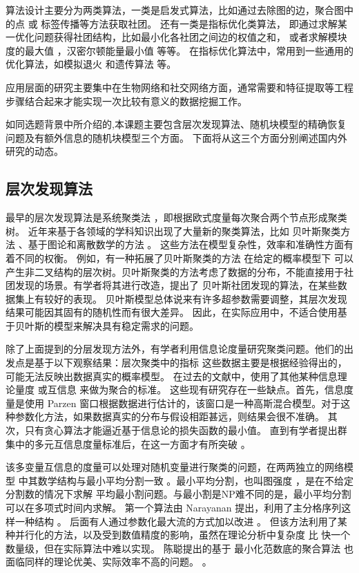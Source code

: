 算法设计主要分为两类算法，一类是启发式算法，比如通过去除图的边\cite{girvan2002community}，聚合图中的点 \cite{clauset2004finding}或
标签传播\cite{raghavan2007near}等方法获取社团。
还有一类是指标优化类算法，
即通过求解某一优化问题获得社团结构，比如最小化各社团之间边的权值之和，
或者求解模块度的最大值 \cite{newman2006modularity}，汉密尔顿能量最小值
\cite{PhysRevLett.93.218701} 等等。
在指标优化算法中，常用到一些通用的优化算法，如模拟退火\cite{PhysRevE.71.046101}
和遗传算法 \cite{pizzuti2008ga}等。

应用层面的研究主要集中在生物网络和社交网络方面，通常需要和特征提取等工程步骤结合起来才能实现一次比较有意义的数据挖掘工作。

如同选题背景中所介绍的,本课题主要包含层次发现算法、随机块模型的精确恢复问题及有额外信息的随机块模型三个方面。
下面将从这三个方面分别阐述国内外研究的动态。
\subsection{层次发现算法}

最早的层次发现算法是系统聚类法 \cite{slink}，即根据欧式度量每次聚合两个节点形成聚类树。
近年来基于各领域的学科知识出现了大量新的聚类算法，比如
贝叶斯聚类方法 \cite{bhc}、基于图论和离散数学的方法 \cite{dasgupta2016cost}
。
这些方法在模型复杂性，效率和准确性方面有着不同的权衡。
例如，有一种拓展了贝叶斯聚类的方法 \cite{blundell2011discovering}
在给定的概率模型下
可以产生非二叉结构的层次树。贝叶斯聚类的方法考虑了数据的分布，不能直接用于社团发现的场景。有学者将其进行改造，提出了
贝叶斯社团发现的算法\cite{RN23}，在某些数据集上有较好的表现。
贝叶斯模型总体说来有许多超参数需要调整，其层次发现结果可能因其固有的随机性而有很大差异。 因此，在实际应用中，不适合使用基于贝叶斯的模型来解决具有稳定需求的问题。 

除了上面提到的分层发现方法外，有学者利用信息论度量研究聚类问题。他们的出发点是基于以下观察结果：层次聚类中的指标
这些数据主要是根据经验得出的，可能无法反映出数据真实的概率模型。
在过去的文献中，使用了其他某种信息理论量度 \cite{ic2002} 或互信息\cite{mim}
来做为聚合的标准。
这些现有研究存在一些缺点。首先，信息度量是使用 Parzen 窗口根据数据进行估计的，该窗口是一种高斯混合模型。对于这种参数化方法，如果数据真实的分布与假设相距甚远，则结果会很不准确。
其次，只有贪心算法才能逼近基于信息论的损失函数的最小值。 
直到有学者提出群集中的多元互信息度量标准后，在这一方面才有所突破 \cite{ic2016}。 

该多变量互信息的度量可以处理对随机变量进行聚类的问题，在两两独立的网络模型 \cite{pin}
中其数学结构与最小平均分割一致  \cite{mac}。最小平均分割，也叫图强度 \cite{cunningham1985optimal}，是在不给定分割数的情况下求解
平均最小割问题。与最小割是NP难不同的是，最小平均分割可以在多项式时间内求解。
第一个算法由 Narayanan 提出，利用了主分格序列这样一种结构 \cite{narayanan}。
后面有人通过参数化最大流的方式加以改进 \cite{pic}。
但该方法利用了某种并行化的方法，以及受到数值精度的影响，虽然在理论分析中复杂度
比 \cite{narayanan} 快一个数量级，但在实际算法中难以实现。
陈聪提出的基于 最小化范数底的聚合算法 也面临同样的理论优美、实际效率不高的问题。 \cite{chan2020agglomerative}。

